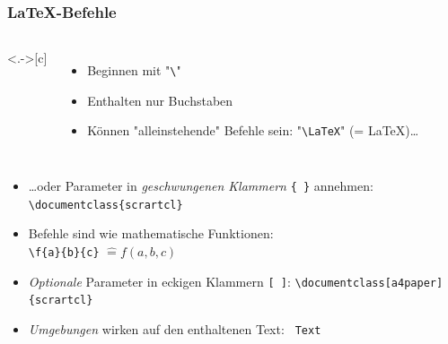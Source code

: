 \begin{frame}[<+->][fragile]
	\frametitle{\LaTeX-Befehle}

	\begin{columns}<.->[c]
		\begin{itemize}
			\item Beginnen mit "\lstinline!\!"
			\item Enthalten nur Buchstaben
			\item Können "alleinstehende" Befehle sein: "\lstinline!\LaTeX!" (= \LaTeX)…
		\end{itemize}

	\end{columns}
	
	\lstset{frame=none, numbers=none, xleftmargin=0cm}
	\begin{itemize}
		\item …oder Parameter in \emph{geschwungenen Klammern} \lstinline!{ }! annehmen:
		\lstinline!\documentclass{scrartcl}!
		\item Befehle sind wie mathematische Funktionen:\\
		\lstinline!\f{a}{b}{c}! $\mathrel{\widehat{=}} f(a, b, c)$
		\item \emph{Optionale} Parameter in eckigen Klammern \verb|[ ]|:
		\lstinline!\documentclass[a4paper]{scrartcl}!
		\item \emph{Umgebungen} wirken auf den enthaltenen Text:
		\lstinline! Text !
	\end{itemize}
\end{frame}

